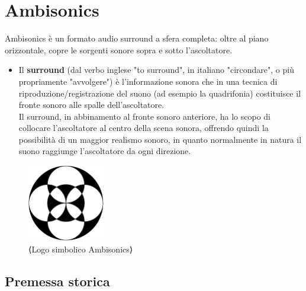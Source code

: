 \chapter{Ambisonics}
\label{chp:Ambisonics}

Ambisonics è un formato audio surround a sfera completa: oltre al piano orizzontale, copre le sorgenti sonore sopra e sotto l'ascoltatore.
\begin{itemize}
\item Il \textbf{surround} (dal verbo inglese "to surround", in italiano "circondare", o più propriamente "avvolgere") è l'informazione sonora che in una tecnica di riproduzione/registrazione del suono (ad esempio la quadrifonia) costituisce il fronte sonoro alle spalle dell'ascoltatore.\\ Il surround, in abbinamento al fronte sonoro anteriore, ha lo scopo di collocare l'ascoltatore al centro della scena sonora, offrendo quindi la possibilità di un maggior realismo sonoro, in quanto normalmente in natura il suono raggiunge l'ascoltatore da ogni direzione.\\
\end{itemize}

\begin{figure}[h]
      \centering
      \includegraphics[width=0.3\textwidth]{Graphics/AmbisonicLogo.png}
      \caption{⟨Logo simbolico Ambisonics⟩}
      \label{fig:⟨etichetta⟩}
      \end{figure}

\section{Premessa storica}

